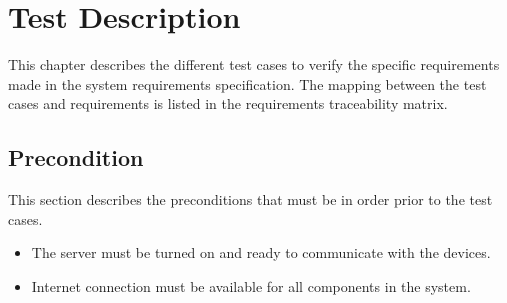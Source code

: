 \chapter{Test Description}
This chapter describes the different test cases to verify the specific requirements made in the system requirements specification. The mapping between the test cases and requirements is listed in the requirements traceability matrix.
\section{Precondition}
This section describes the preconditions that must be in order prior to the test cases.

\begin{itemize}
\item The server must be turned on and ready to communicate with the devices.
\item Internet connection must be available for all components in the system.
\end{itemize}












